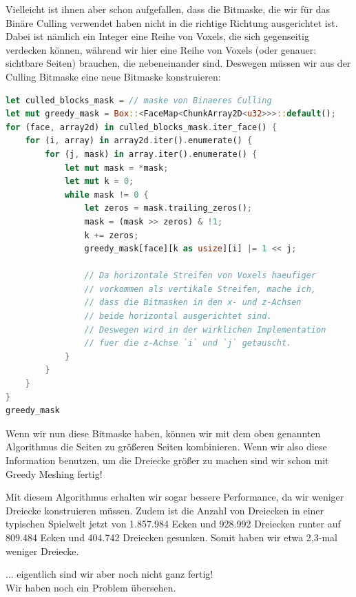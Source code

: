 Vielleicht ist ihnen aber schon aufgefallen,
dass die Bitmaske, die wir für das Binäre Culling
verwendet haben nicht in die richtige Richtung
ausgerichtet ist.
Dabei ist nämlich ein Integer eine Reihe von Voxels,
die sich gegenseitig verdecken können, während wir
hier eine Reihe von Voxels
(oder genauer: sichtbare Seiten)
brauchen, die nebeneinander sind.
Deswegen müssen wir aus der Culling Bitmaske
eine neue Bitmaske konstruieren:

\begin{lstlisting}[language=Rust]
let culled_blocks_mask = // maske von Binaeres Culling
let mut greedy_mask = Box::<FaceMap<ChunkArray2D<u32>>>::default();
for (face, array2d) in culled_blocks_mask.iter_face() {
	for (i, array) in array2d.iter().enumerate() {
		for (j, mask) in array.iter().enumerate() {
			let mut mask = *mask;
			let mut k = 0;
			while mask != 0 {
				let zeros = mask.trailing_zeros();
				mask = (mask >> zeros) & !1;
				k += zeros;
				greedy_mask[face][k as usize][i] |= 1 << j;

				// Da horizontale Streifen von Voxels haeufiger
				// vorkommen als vertikale Streifen, mache ich,
				// dass die Bitmasken in den x- und z-Achsen
				// beide horizontal ausgerichtet sind.
				// Deswegen wird in der wirklichen Implementation
				// fuer die z-Achse `i` und `j` getauscht.
			}
		}
	}
}
greedy_mask
\end{lstlisting}

Wenn wir nun diese Bitmaske haben, können wir mit dem
oben genannten Algorithmus die Seiten zu größeren
Seiten kombinieren.
Wenn wir also diese Information benutzen,
um die Dreiecke größer zu machen sind wir
schon mit Greedy Meshing fertig!

\vspace{0.5cm}


Mit diesem Algorithmus erhalten wir sogar bessere
Performance, da wir weniger Dreiecke konstruieren
müssen.
Zudem ist die Anzahl von Dreiecken in einer
typischen Spielwelt jetzt von
1.857.984 Ecken und 928.992 Dreiecken
runter auf 809.484 Ecken und 404.742 Dreiecken
gesunken.
Somit haben wir etwa 2,3-mal weniger Dreiecke.

\vspace{0.7cm}

{
	\setlength{\parindent}{0pt}
	... eigentlich sind wir aber noch nicht ganz fertig!\\
	Wir haben noch ein Problem übersehen.
}
